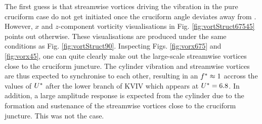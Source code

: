 \documentclass[oneside]{utmthesis}
\begin{document}
The first guess is that streamwise vortices driving the vibration in the pure cruciform case do not get initiated once the cruciform angle deviates away from \angfi{}. However, $x$ and $z$-component vorticity visualisations in Fig. \ref{fig:vortStruct67545} points out otherwise. These visualisations are produced under the same conditions as Fig. \ref{fig:vortStruct90}. Inspecting Figs. \ref{fig:vorx675} and \ref{fig:vorx45}, one can quite clearly make out the large-scale streamwise vortices close to the cruciform juncture. The cylinder vibration and streamwise vortices are thus expected to synchronise to each other, resulting in an $f^{*} \approx 1$ accross the values of $U^{*}$ after the lower branch of KVIV which appears at $U^{*} = 6.8$. In addition, a large amplitude response is expected from the cylinder due to the formation and sustenance of the streamwise vortices close to the cruciform juncture. This was not the case.
\end{document}
